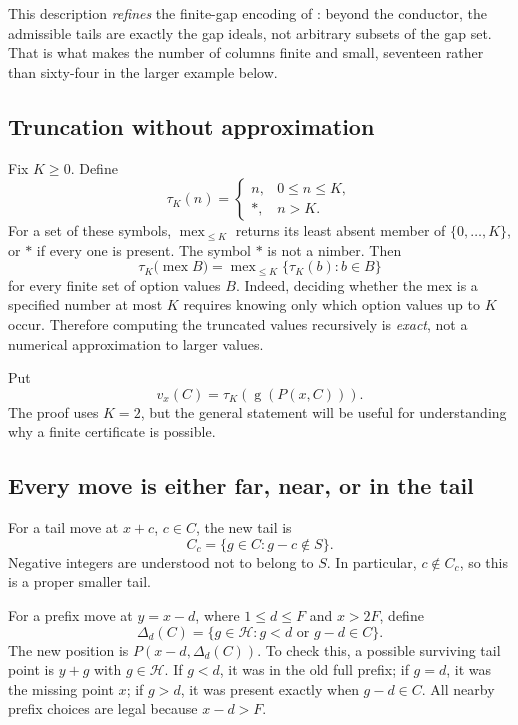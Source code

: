 \documentclass[11pt,letterpaper]{article}
\numberwithin{equation}{section}
\theoremstyle{definition}
\theoremstyle{remark}
\newcommand{\sg}{\operatorname{g}}
\newcommand{\mex}{\operatorname{mex}}
\newcommand{\sat}{\ast}
\newcommand{\HH}{\mathcal H}
\begin{document}
This description \emph{refines} the finite-gap encoding of
\cite[Section 6]{GMK18}: beyond the conductor, the admissible tails are
exactly the gap ideals, not arbitrary subsets of the gap set. That is what
makes the number of columns finite and small, seventeen rather than
sixty-four in the larger example below.

\subsection{Truncation without approximation}

Fix $K\geq0$. Define
\[
 \tau_K(n)=\begin{cases}n,&0\leq n\leq K,\\
                          \sat,&n>K.
             \end{cases}
\]
For a set of these symbols, $\mex_{\leq K}$ returns its least absent
member of $\{0,\ldots,K\}$, or $\sat$ if every one is present.
The symbol $\sat$ is not a nimber. Then
\begin{equation}\label{eq:exact-truncation}
 \tau_K\bigl(\mex B\bigr)=
 \mex_{\leq K}\{\tau_K(b):b\in B\}
\end{equation}
for every finite set of option values $B$. Indeed, deciding whether
the mex is a specified number at most $K$ requires knowing only
which option values up to $K$ occur. Therefore computing the
truncated values recursively is \emph{exact}, not a numerical
approximation to larger values.

Put
\[
 v_x(C)=\tau_K(\sg(P(x,C))).
\]
The proof uses $K=2$, but the general statement will be useful for
understanding why a finite certificate is possible.

\subsection{Every move is either far, near, or in the tail}

For a tail move at $x+c$, $c\in C$, the new tail is
\begin{equation}\label{eq:cut}
 C_c=\{g\in C:g-c\notin S\}.
\end{equation}
Negative integers are understood not to belong to $S$. In particular,
$c\notin C_c$, so this is a proper smaller tail.

For a prefix move at $y=x-d$, where $1\leq d\leq F$ and
$x>2F$, define
\begin{equation}\label{eq:delta}
 \Delta_d(C)=\{g\in\HH:g<d\text{ or }g-d\in C\}.
\end{equation}
The new position is $P(x-d,\Delta_d(C))$. To check this, a possible
surviving tail point is $y+g$ with $g\in\HH$. If $g<d$, it was in
the old full prefix; if $g=d$, it was the missing point $x$;
if $g>d$, it was present exactly when $g-d\in C$.
All nearby prefix choices are legal because $x-d>F$.
\end{document}
